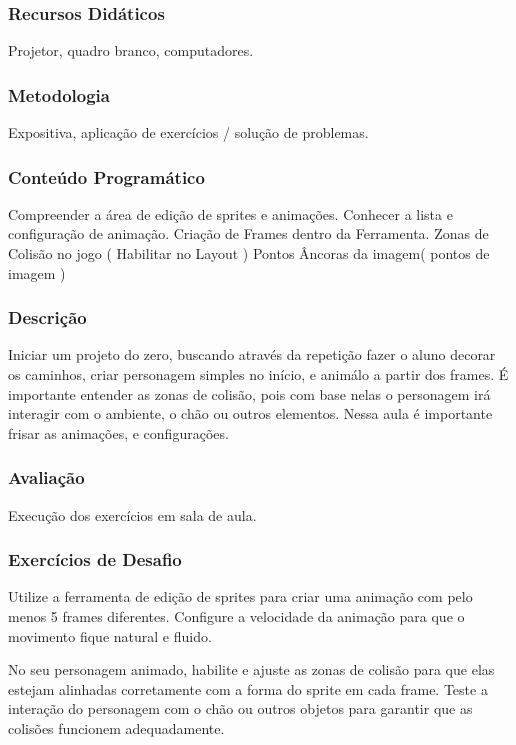 \documentclass[letterpaper,10pt,brazil]{sphinxmanual}
\begin{document}
\subsubsection*{Recursos Didáticos}

\sphinxAtStartPar
Projetor, quadro branco, computadores.
\subsubsection*{Metodologia}

\sphinxAtStartPar
Expositiva, aplicação de exercícios / solução de problemas.
\subsubsection*{Conteúdo Programático}

\sphinxAtStartPar
Compreender a área de edição de sprites e animações.
Conhecer a lista e configuração de animação.
Criação de Frames dentro da Ferramenta.
Zonas de Colisão no jogo ( Habilitar no Layout )
Pontos Âncoras da imagem( pontos de imagem )
\subsubsection*{Descrição}

\sphinxAtStartPar
Iniciar um projeto do zero, buscando através da repetição fazer o aluno decorar os
caminhos, criar personagem simples no início, e animá\sphinxhyphen{}lo a partir dos frames.
É importante entender as zonas de colisão, pois com base nelas o personagem irá interagir
com o ambiente, o chão ou outros elementos.
Nessa aula é importante frisar as animações, e configurações.
\subsubsection*{Avaliação}

\sphinxAtStartPar
Execução dos exercícios em sala de aula.
\subsubsection*{Exercícios de Desafio}

\sphinxAtStartPar
{}
Utilize a ferramenta de edição de sprites para criar uma animação com pelo menos 5 frames diferentes.
Configure a velocidade da animação para que o movimento fique natural e fluido.

\sphinxAtStartPar
{}
No seu personagem animado, habilite e ajuste as zonas de colisão para que elas estejam alinhadas corretamente com a forma do sprite em cada frame.
Teste a interação do personagem com o chão ou outros objetos para garantir que as colisões funcionem adequadamente.
\end{document}
